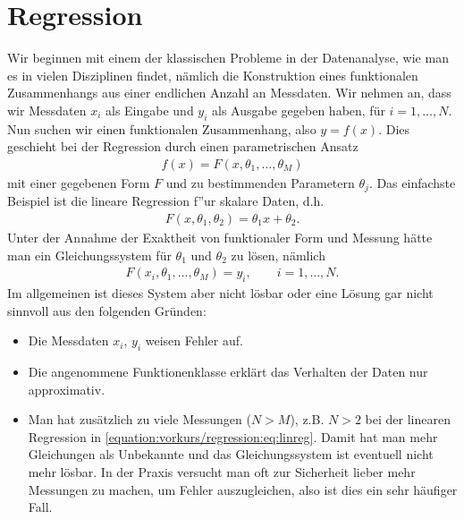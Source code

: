 \documentclass[letterpaper,10pt,english]{jupyterBook}
\begin{document}
\section{Regression}
\label{\detokenize{vorkurs/regression:regression}}\label{\detokenize{vorkurs/regression::doc}}
Wir beginnen mit einem der klassischen Probleme in der Datenanalyse, wie man es in vielen Disziplinen findet, nämlich die Konstruktion eines funktionalen Zusammenhangs aus einer endlichen Anzahl an Messdaten. Wir nehmen an, dass
wir Messdaten \(x_i\) als Eingabe und \(y_i\) als Ausgabe gegeben haben, für \(i=1,\ldots, N\). Nun suchen wir einen funktionalen Zusammenhang, also \(y=f(x)\). Dies geschieht bei der Regression durch einen parametrischen Ansatz
\begin{equation*}
\begin{split} f(x) = F(x,\theta_1,\ldots,\theta_M) \end{split}
\end{equation*}
mit einer gegebenen Form \(F\) und   zu bestimmenden Parametern \(\theta_j\). Das einfachste Beispiel ist die lineare Regression f”ur skalare Daten, d.h.
\begin{equation}\label{equation:vorkurs/regression:eq:linreg}
\begin{split}F(x,\theta_1,\theta_2) = \theta_1 x + \theta_2 .\end{split}
\end{equation}
Unter der Annahme der Exaktheit von funktionaler Form und Messung hätte man ein Gleichungssystem für \(\theta_1\) und \(\theta_2\) zu lösen, nämlich
\begin{equation}\label{equation:vorkurs/regression:eq:nonlinreg}
\begin{split} F(x_i,\theta_1,\ldots,\theta_M) = y_i, \qquad i=1,\ldots,N. \end{split}
\end{equation}
Im allgemeinen ist dieses System aber nicht lösbar oder eine Lösung gar nicht sinnvoll aus den folgenden Gründen:
\begin{itemize}
\item {} 
Die Messdaten \(x_i\), \(y_i\) weisen Fehler auf.

\item {} 
Die angenommene Funktionenklasse erklärt das Verhalten der Daten nur approximativ.

\item {} 
Man hat zusätzlich zu viele Messungen (\(N > M\)), z.B. \(N > 2\) bei der linearen Regression in \eqref{equation:vorkurs/regression:eq:linreg}. Damit hat man mehr Gleichungen als Unbekannte und das Gleichungssystem ist eventuell nicht mehr lösbar. In der Praxis versucht man oft zur Sicherheit lieber mehr Messungen zu machen, um Fehler auszugleichen, also ist dies ein sehr häufiger Fall.

\end{itemize}
\end{document}
